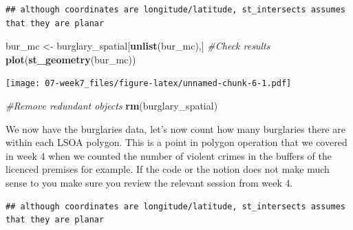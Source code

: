 \documentclass[]{book}
\newenvironment{Shaded}{\begin{snugshade}}{\end{snugshade}}
\newcommand{\CommentTok}[1]{\textcolor[rgb]{0.56,0.35,0.01}{\textit{#1}}}
\newcommand{\DataTypeTok}[1]{\textcolor[rgb]{0.13,0.29,0.53}{#1}}
\newcommand{\KeywordTok}[1]{\textcolor[rgb]{0.13,0.29,0.53}{\textbf{#1}}}
\newcommand{\NormalTok}[1]{#1}
\newcommand{\OperatorTok}[1]{\textcolor[rgb]{0.81,0.36,0.00}{\textbf{#1}}}
\newcommand{\OtherTok}[1]{\textcolor[rgb]{0.56,0.35,0.01}{#1}}
\newcommand{\StringTok}[1]{\textcolor[rgb]{0.31,0.60,0.02}{#1}}
\begin{document}
\begin{verbatim}
## although coordinates are longitude/latitude, st_intersects assumes that they are planar
\end{verbatim}

\begin{Shaded}
\begin{Highlighting}[]
\NormalTok{bur_mc <-}\StringTok{ }\NormalTok{burglary_spatial[}\KeywordTok{unlist}\NormalTok{(bur_mc),]}
\CommentTok{#Check results}
\KeywordTok{plot}\NormalTok{(}\KeywordTok{st_geometry}\NormalTok{(bur_mc))}
\end{Highlighting}
\end{Shaded}

\texttt{[image: 07-week7\_files/figure-latex/unnamed-chunk-6-1.pdf]}

\begin{Shaded}
\begin{Highlighting}[]
\CommentTok{#Remove redundant objects}
\KeywordTok{rm}\NormalTok{(burglary_spatial)}
\end{Highlighting}
\end{Shaded}

We now have the burglaries data, let's now count how many burglaries there are within each LSOA polygon. This is a point in polygon operation that we covered in week 4 when we counted the number of violent crimes in the buffers of the licenced premises for example. If the code or the notion does not make much sense to you make sure you review the relevant session from week 4.

\begin{Shaded}
\end{Shaded}

\begin{verbatim}
## although coordinates are longitude/latitude, st_intersects assumes that they are planar
\end{verbatim}
\end{document}
